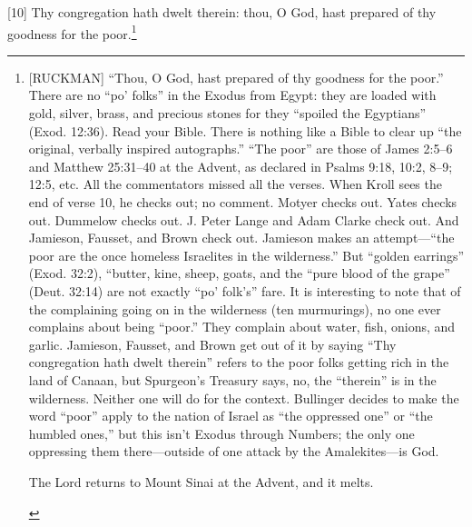 [10] \textcolor[rgb]{0.00,0.00,1.00}{Thy congregation hath dwelt therein: thou, O God, hast prepared of thy goodness for the poor.}\footnote{[RUCKMAN] “Thou, O God, hast prepared of thy goodness for the poor.” There are no “po’ folks” in the Exodus from Egypt: they are loaded with gold, silver, brass, and precious stones for they “spoiled the Egyptians” (Exod. 12:36). Read your Bible. There is nothing like a Bible to clear up “the original, verbally inspired autographs.” “The poor” are those of James 2:5--6 and Matthew 25:31--40 at the Advent, as declared in Psalms 9:18, 10:2, 8--9; 12:5, etc. All the commentators missed all the verses. When Kroll sees the end of verse 10, he checks out; no comment. Motyer checks out. Yates checks out. Dummelow checks out. J. Peter Lange and Adam Clarke check out. And Jamieson, Fausset, and Brown check out. Jamieson makes an attempt—“the poor are the once homeless Israelites in the wilderness.” But “golden earrings” (Exod. 32:2), “butter, kine, sheep, goats, and the “pure blood of the grape” (Deut. 32:14) are not exactly “po’ folk’s” fare. It is interesting to note that of the complaining going on in the wilderness (ten murmurings), no one ever complains about being “poor.” They complain about water, fish, onions, and garlic. Jamieson, Fausset, and Brown get out of it by saying “Thy congregation hath dwelt therein” refers to the poor folks getting rich in the land of Canaan, but Spurgeon’s Treasury says, no, the “therein” is in the wilderness. Neither one will do for the context. Bullinger decides to make the word “poor” apply to the nation of Israel as “the oppressed one” or “the humbled ones,” but this isn’t Exodus through Numbers; the only one oppressing them there—outside of one attack by the Amalekites—is God.  \cite{Ruckman1992Psalms}  
\begin{compactenum}
\item The Lord returns to Mount Sinai at the Advent, and it melts.

\end{compactenum}}
